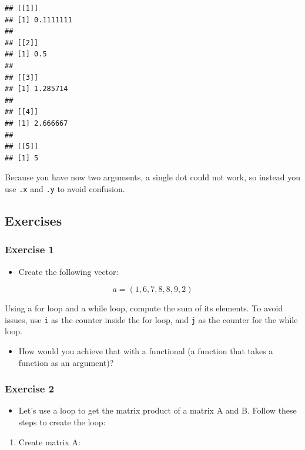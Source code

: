\documentclass[]{gitbook}
\providecommand{\tightlist}{%
  \setlength{\itemsep}{0pt}\setlength{\parskip}{0pt}}
\theoremstyle{definition}
\theoremstyle{definition}
\theoremstyle{definition}
\theoremstyle{remark}
\begin{document}
\begin{verbatim}
## [[1]]
## [1] 0.1111111
## 
## [[2]]
## [1] 0.5
## 
## [[3]]
## [1] 1.285714
## 
## [[4]]
## [1] 2.666667
## 
## [[5]]
## [1] 5
\end{verbatim}

Because you have now two arguments, a single dot could not work, so
instead you use \texttt{.x} and \texttt{.y} to avoid confusion.

\hypertarget{exercises-5}{%
\subsection{Exercises}\label{exercises-5}}

\hypertarget{exercise-1-5}{%
\subsubsection*{Exercise 1}\label{exercise-1-5}}

\begin{itemize}
\tightlist
\item
  Create the following vector:
\end{itemize}

\[a = (1,6,7,8,8,9,2)\]

Using a for loop and a while loop, compute the sum of its elements. To
avoid issues, use \texttt{i} as the counter inside the for loop, and
\texttt{j} as the counter for the while loop.

\begin{itemize}
\tightlist
\item
  How would you achieve that with a functional (a function that takes a
  function as an argument)?
\end{itemize}

\hypertarget{exercise-2-3}{%
\subsubsection*{Exercise 2}\label{exercise-2-3}}

\begin{itemize}
\tightlist
\item
  Let's use a loop to get the matrix product of a matrix A and B. Follow
  these steps to create the loop:
\end{itemize}

\begin{enumerate}
\def\labelenumi{\arabic{enumi})}
\tightlist
\item
  Create matrix A:
\end{enumerate}
\end{document}
